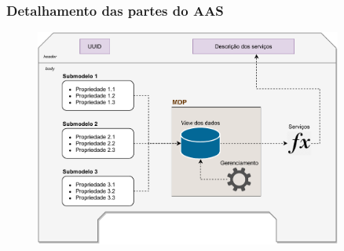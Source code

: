 \documentclass[10pt]{beamer}
\begin{document}
\fi
\begin{frame}
	\frametitle{Detalhamento das partes do AAS}
	
	\begin{figure}[htb]
		\centering
		\label{fig:estrutura-aas}
		\includegraphics[width=0.9\textwidth]{estrutura-aas}
	\end{figure}
	
\end{frame}
\end{document}
